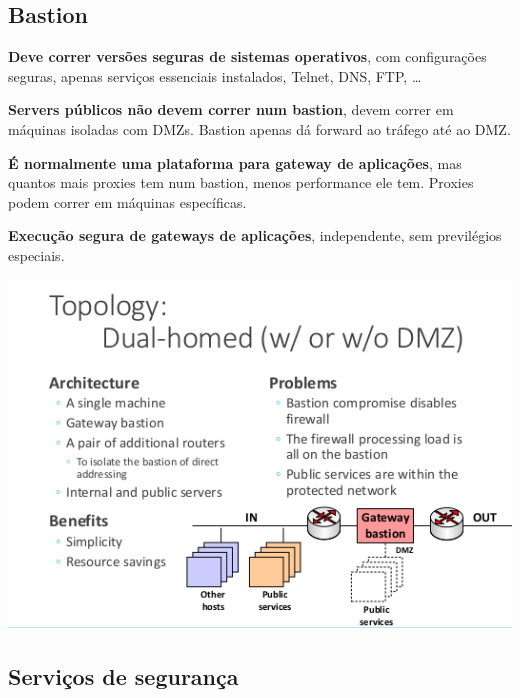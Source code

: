 \documentclass{article}
\begin{document}
\pagebreak

\subsection{Bastion}

\begin{flushleft}
  \textbf{Deve correr versões seguras de sistemas operativos}, com configurações seguras,
  apenas serviços essenciais instalados, Telnet, DNS, FTP, \dots

  \vspace{2mm}

  \textbf{Servers públicos não devem correr num bastion}, devem correr
  em máquinas isoladas com DMZs. Bastion apenas dá forward ao tráfego
  até ao DMZ.

  \vspace{2mm}

  \textbf{É normalmente uma plataforma para gateway de aplicações}, mas quantos mais proxies
  tem num bastion, menos performance ele tem. Proxies podem correr em máquinas
  específicas.

  \vspace{2mm}

  \textbf{Execução segura de gateways de aplicações}, independente, sem previlégios
  especiais.
\end{flushleft}

\begin{center}
  \includegraphics[scale=0.4]{58}
\end{center}

\subsection{Serviços de segurança}
\end{document}
